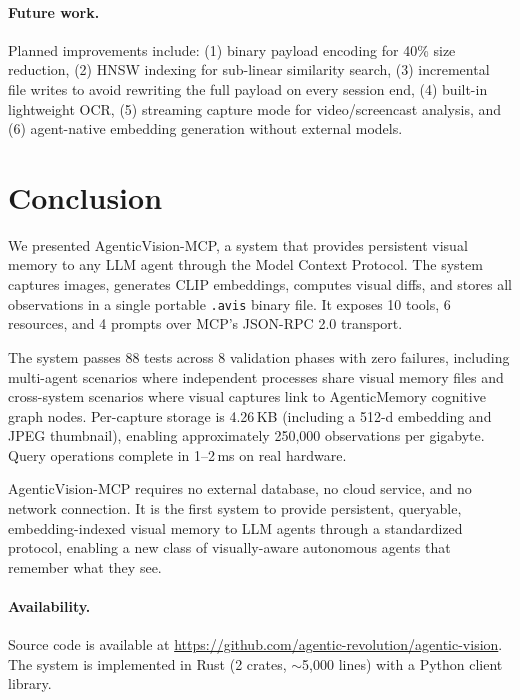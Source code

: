 \documentclass[10pt, twocolumn]{article}
\begin{document}
\paragraph{Future work.}
Planned improvements include: (1) binary payload encoding for 40\% size reduction, (2) HNSW indexing for sub-linear similarity search, (3) incremental file writes to avoid rewriting the full payload on every session end, (4) built-in lightweight OCR, (5) streaming capture mode for video/screencast analysis, and (6) agent-native embedding generation without external models.


\section{Conclusion}

We presented AgenticVision-MCP, a system that provides persistent visual memory to any LLM agent through the Model Context Protocol. The system captures images, generates CLIP embeddings, computes visual diffs, and stores all observations in a single portable \texttt{.avis} binary file. It exposes 10 tools, 6 resources, and 4 prompts over MCP's JSON-RPC 2.0 transport.

The system passes 88 tests across 8 validation phases with zero failures, including multi-agent scenarios where independent processes share visual memory files and cross-system scenarios where visual captures link to AgenticMemory cognitive graph nodes. Per-capture storage is 4.26\,KB (including a 512-d embedding and JPEG thumbnail), enabling approximately 250{,}000 observations per gigabyte. Query operations complete in 1--2\,ms on real hardware.

AgenticVision-MCP requires no external database, no cloud service, and no network connection. It is the first system to provide persistent, queryable, embedding-indexed visual memory to LLM agents through a standardized protocol, enabling a new class of visually-aware autonomous agents that remember what they see.

\paragraph{Availability.} Source code is available at \url{https://github.com/agentic-revolution/agentic-vision}. The system is implemented in Rust (2 crates, $\sim$5{,}000 lines) with a Python client library.



\end{document}
